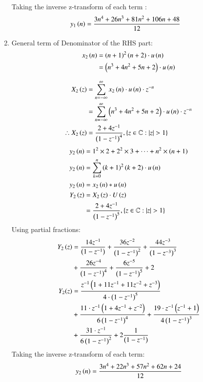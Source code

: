 \documentclass[journal,12pt,twocolumn]{IEEEtran}
\theoremstyle{remark}
\begin{document}
\begin{enumerate}[label=\arabic*.]
Taking the inverse z-transform of each term : 
\begin{align}
    y_1\left(n\right) &= \frac{3n^4 + 26n^3 + 81n^2 + 106n + 48}{12}
\end{align}
\item General term of Denominator of the RHS part:
\begin{align}
    x_2\left(n\right) &= \left(n+1\right)^{2}\left(n+2\right)\cdot u\left(n\right)\\
                &= \left(n^{3}+4n^{2}+5n+2\right)\cdot u\left(n\right) \label{eq:11.9.5.26.3}
\end{align}


\begin{align}
    X_2\left(z\right) &= \sum_{n=-\infty}^\infty x_2\left(n\right)\cdot u\left(n\right)\cdot z^{-n}\\
                &= \sum_{n=-\infty}^\infty \left(n^{3}+4n^{2}+5n+2\right)\cdot u\left(n\right)\cdot z^{-n}\\
   \therefore  X_2\left(z\right) &= \frac{2+4z^{-1}}{\left(1-z^{-1}\right)^4},\left\{z\in\mathbb{C} : \lvert z \rvert > 1\right\}   
\end{align}
\begin{align}
    y_2\left(n\right) &= 1^2\times2 + 2^2\times3 + \dots + n^2\times\left(n+1\right)\\
    y_2\left(n\right) &= \sum_{k=0}^n \left(k+1\right)^2\left(k+2\right)\cdot u\left(n\right) \\
    y_2\left(n\right) &= x_2\left(n\right)\ast u\left(n\right)\\
    Y_2\left(z\right) &= X_2\left(z\right)\cdot U\left(z\right) \\
 &=\frac{2+4z^{-1}}{\left(1-z^{-1}\right)^5} ,\left\{z\in\mathbb{C} : \lvert z \rvert > 1\right\} 
\end{align}
Using partial fractions:
\begin{align}
    Y_2\left(z\right) &= \frac{14z^{-1}}{\left(1-z^{-1}\right)} + \frac{36z^{-2}}{\left(1-z^{-1}\right)^2} + \frac{44z^{-3}}{\left(1-z^{-3}\right)^3} \\&+ \frac{26z^{-4}}{\left(1-z^{-1}\right)^4}+\frac{6z^{-5}}{\left(1-z^{-1}\right)^5}+2\notag \\
     Y_2(z) &= \frac{z^{-1}\left(1+11z^{-1}+11z^{-2}+z^{-3}\right)}{4\cdot \left(1-z^{-1}\right)^5} \\ &+ \frac{11\cdot z^{-1}\left(1+4z^{-1}+z^{-2}\right)}{6\left(1-z^{-1}\right)^4} 
    + \frac{19\cdot z^{-1}\left(z^{-1}+1\right)}{4\left(1-z^{-1}\right)^3} \notag \\ &+\frac{31\cdot z^{-1}}{6\left(1-z^{-1}\right)^2} \notag 
    + 2\frac{1}{\left(1-z^{-1}\right)} \notag
\end{align}
Taking the inverse z-transform of each term:
\begin{align}
    y_2\left(n\right) =  \frac{3n^4 + 22n^3 + 57n^2 + 62n + 24}{12}
\end{align}
\end{enumerate}
\end{document}

